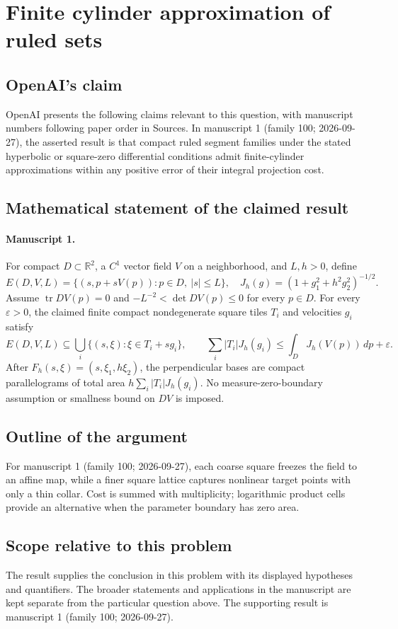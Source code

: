 \documentclass[11pt]{article}
\begin{document}
\section*{Finite cylinder approximation of ruled sets}

\subsection{OpenAI's claim}
OpenAI presents the following claims relevant to this question, with manuscript numbers following paper order in Sources. In manuscript 1 (family 100; 2026-09-27), the asserted result is that compact ruled segment families under the stated hyperbolic or square-zero differential conditions admit finite-cylinder approximations within any positive error of their integral projection cost.

\subsection{Mathematical statement of the claimed result}
\paragraph{Manuscript 1.}
For compact $D\subset\mathbb R^2$, a $C^1$ vector field $V$ on a neighborhood, and $L,h>0$, define
\[
 E(D,V,L)=\{(s,p+sV(p)):p\in D,\ |s|\le L\},\quad
 J_h(g)=(1+g_1^2+h^2g_2^2)^{-1/2}.
\]
Assume $\operatorname{tr}DV(p)=0$ and $-L^{-2}<\det DV(p)\le0$ for every $p\in D$. For every $\varepsilon>0$, the claimed finite compact nondegenerate square tiles $T_i$ and velocities $g_i$ satisfy
\[
 E(D,V,L)\subseteq\bigcup_i\{(s,\xi):\xi\in T_i+sg_i\},\qquad
 \sum_i|T_i|J_h(g_i)\le\int_DJ_h(V(p))\,dp+\varepsilon.
\]
After $F_h(s,\xi)=(s,\xi_1,h\xi_2)$, the perpendicular bases are compact parallelograms of total area $h\sum_i|T_i|J_h(g_i)$. No measure-zero-boundary assumption or smallness bound on $DV$ is imposed.

\subsection{Outline of the argument}
For manuscript 1 (family 100; 2026-09-27), each coarse square freezes the field to an affine map, while a finer square lattice captures nonlinear target points with only a thin collar. Cost is summed with multiplicity; logarithmic product cells provide an alternative when the parameter boundary has zero area.

\subsection{Scope relative to this problem}
The result supplies the conclusion in this problem with its displayed hypotheses and quantifiers. The broader statements and applications in the manuscript are kept separate from the particular question above. The supporting result is manuscript 1 (family 100; 2026-09-27).
\end{document}
